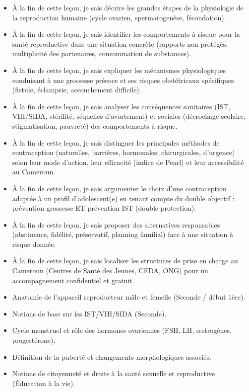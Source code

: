 \documentclass[11pt]{article}
\begin{document}
\begin{objectifs}
\begin{itemize}
\item À la fin de cette leçon, je sais décrire les grandes étapes de la physiologie de la reproduction humaine (cycle ovarien, spermatogenèse, fécondation).
\item À la fin de cette leçon, je sais identifier les comportements à risque pour la santé reproductive dans une situation concrète (rapports non protégés, multiplicité des partenaires, consommation de substances).
\item À la fin de cette leçon, je sais expliquer les mécanismes physiologiques conduisant à une grossesse précoce et ses risques obstétricaux spécifiques (fistule, éclampsie, accouchement difficile).
\item À la fin de cette leçon, je sais analyser les conséquences sanitaires (IST, VIH/SIDA, stérilité, séquelles d'avortement) et sociales (décrochage scolaire, stigmatisation, pauvreté) des comportements à risque.
\item À la fin de cette leçon, je sais distinguer les principales méthodes de contraception (naturelles, barrières, hormonales, chirurgicales, d'urgence) selon leur mode d'action, leur efficacité (indice de Pearl) et leur accessibilité au Cameroun.
\item À la fin de cette leçon, je sais argumenter le choix d'une contraception adaptée à un profil d'adolescent(e) en tenant compte du double objectif : prévention grossesse ET prévention IST (double protection).
\item À la fin de cette leçon, je sais proposer des alternatives responsables (abstinence, fidélité, préservatif, planning familial) face à une situation à risque donnée.
\item À la fin de cette leçon, je sais localiser les structures de prise en charge au Cameroun (Centres de Santé des Jeunes, CEDA, ONG) pour un accompagnement confidentiel et gratuit.
\end{itemize}
\end{objectifs}

\begin{prerequis}
\begin{itemize}
\item Anatomie de l'appareil reproducteur mâle et femelle (Seconde / début 1ère).
\item Notions de base sur les IST/VIH/SIDA (Seconde).
\item Cycle menstruel et rôle des hormones ovariennes (FSH, LH, œstrogènes, progestérone).
\item Définition de la puberté et changements morphologiques associés.
\item Notions de citoyenneté et droits à la santé sexuelle et reproductive (Éducation à la vie).
\end{itemize}
\end{prerequis}
\end{document}
